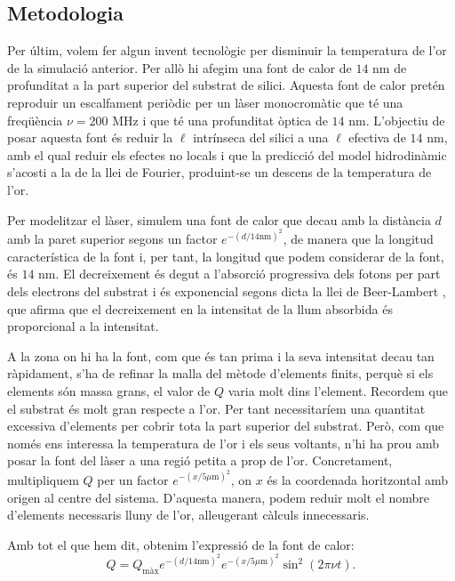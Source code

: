 \documentclass{article}
\begin{document}
\subsection{Metodologia}

Per \'{u}ltim, volem fer algun invent tecnol\`{o}gic per disminuir la temperatura de l'or de la simulaci\'{o} anterior. Per all\`{o} hi afegim una font de calor de $14$ nm de profunditat a la part superior del substrat de silici. Aquesta font de calor pret\'{e}n reproduir un escalfament peri\`{o}dic per un l\`{a}ser monocrom\`{a}tic que t\'{e} una freq\"{u}\`{e}ncia $\nu=200$ MHz i que t\'{e} una profunditat \`{o}ptica de $14$ nm. L'objectiu de posar aquesta font \'{e}s reduir la $\ell$ intr\'{i}nseca del silici a una $\ell$ efectiva de $14$ nm, amb el qual reduir els efectes no locals i que la predicci\'{o} del model hidrodin\`{a}mic s'acosti a la de la llei de Fourier, produint-se un descens de la temperatura de l'or.

Per modelitzar el l\`{a}ser, simulem una font de calor que decau amb la dist\`{a}ncia $d$ amb la paret superior segons un factor $e^{-(d/14\text{nm})^2}$, de manera que la longitud caracter\'{i}stica de la font i, per tant, la longitud que podem considerar de la font, \'{e}s $14$ nm. El decreixement \'{e}s degut a l'absorci\'{o} progressiva dels fotons per part dels electrons del substrat i \'{e}s exponencial segons dicta la llei de Beer-Lambert \cite{lambert1760jh}, que afirma que el decreixement en la intensitat de la llum absorbida \'{e}s proporcional a la intensitat.

A la zona on hi ha la font, com que \'{e}s tan prima i la seva intensitat decau tan r\`{a}pidament, s'ha de refinar la malla del m\`{e}tode d'elements finits, perqu\`{e} si els elements s\'{o}n massa grans, el valor de $Q$ varia molt dins l'element. Recordem que el substrat \'{e}s molt gran respecte a l'or. Per tant necessitar\'{i}em una quantitat excessiva d'elements per cobrir tota la part superior del substrat. Per\`{o}, com que nom\'{e}s ens interessa la temperatura de l'or i els seus voltants, n'hi ha prou amb posar la font del l\`{a}ser a una regi\'{o} petita a prop de l'or. Concretament, multipliquem $Q$ per un factor $e^{-(x/5\mu\text{m})^2}$, on $x$ \'{e}s la coordenada horitzontal amb origen al centre del sistema. D'aquesta manera, podem reduir molt el nombre d'elements necessaris lluny de l'or, alleugerant c\`{a}lculs innecessaris.

Amb tot el que hem dit, obtenim l'expressi\'{o} de la font de calor:
\[Q=Q_{\text{m\`{a}x}}e^{-(d/14\text{nm})^2}e^{-(x/5\mu\text{m})^2}\sin^2(2\pi\nu t).\]
\end{document}
